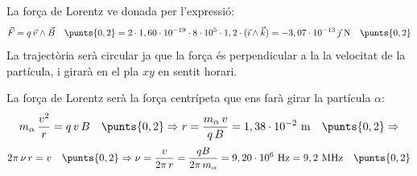 \begin{solapartat}
La força de Lorentz ve donada per l'expressió:
\[ \vec{F} = q\,\vec{v}\wedge\vec{B} \quad\punts{0,2} = 2\cdot 1,60\cdot 10^{-19}\cdot 8\cdot 10^{5}\cdot 1,2\cdot(\vec{\imath}\wedge\vec{k}) = -3,07\cdot 10^{-13}\,\vec{\jmath}\ \mathrm{N} \quad\punts{0,2} \]
La trajectòria serà circular ja que la força és perpendicular a la la velocitat de la partícula, %
  i girarà en el pla $xy$ en sentit horari. 

\end{solapartat}

\begin{solapartat}
La força de Lorentz serà la força centrípeta que ens farà girar la partícula $\alpha$: 
\[ m_\alpha\,\frac{v^2}{r} = q\,v\,B \quad\punts{0,2} \Rightarrow r = \frac{m_\alpha\,v}{q\,B} = 1,38\cdot 10^{-2}\ \mathrm{m} \quad\punts{0,2} \Rightarrow \]
\[ 2\pi\,\nu\,r = v \quad\punts{0,2} \Rightarrow \nu = \frac{v}{2\pi\,r} = \frac{qB}{2\pi\,m_\alpha} = 9,20\cdot 10^{6}\ \mathrm{Hz} = 9,2\ \mathrm{MHz} \quad\punts{0,2} \]
\end{solapartat}
